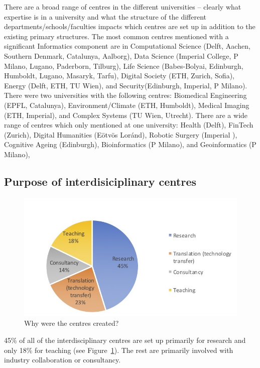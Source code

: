 There are a broad range of centres in the different universities -- clearly what expertise is in a university and what the structure of the different departments/schools/faculties impacts which centres are set up in addition to the existing primary structures. The most common centres mentioned with a significant Informatics component are in Computational Science (Delft, Aachen, Southern Denmark, Catalunya, Aalborg), Data Science (Imperial College, P Milano, Lugano, Paderborn, Tilburg),  Life Science (Babes-Bolyai,  Edinburgh, Humboldt, Lugano, Masaryk, Tarfu), Digital Society (ETH, Zurich, Sofia), Energy (Delft, ETH, TU Wien), and Security(Edinburgh, Imperial, P Milano).   There were two universities with the following centres: Biomedical Engineering (EPFL, Catalunya), Environment/Climate (ETH, Humboldt),  Medical Imaging (ETH, Imperial), and  Complex Systems (TU Wien, Utrecht). There are a wide range of centres which only mentioned at one university: Health (Delft),  FinTech (Zurich), Digital Humanities (E\" otv\"os Lor\'and), Robotic Surgery (Imperial ), Cognitive Ageing (Edinburgh), Bioinformatics (P Milano), and Geoinformatics (P Milano), 
 


\subsection{Purpose of interdisiciplinary centres}

\begin{figure}[h]
\centering
\includegraphics[width = \linewidth]{charts/5b.jpg}
\caption{Why were the centres created?}
\label{sect5:reasons}
\end{figure}

45\% of all of the interdisciplinary centres are set up primarily for research and only 18\% for teaching (see Figure~\ref{sect5:reasons}). The rest are primarily involved with industry collaboration or consultancy.


